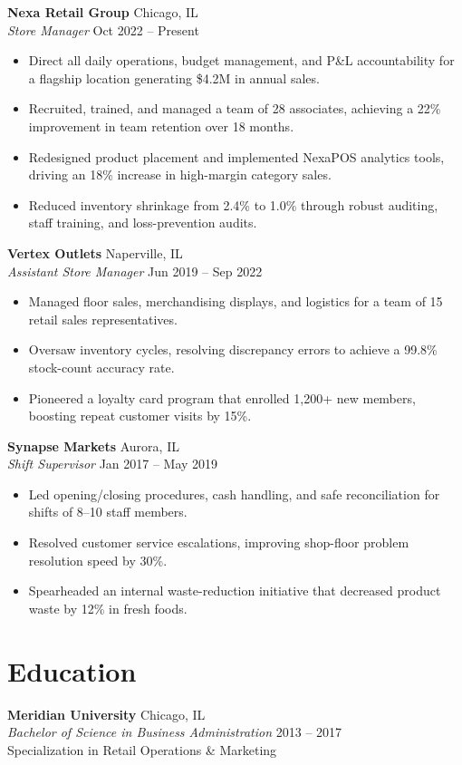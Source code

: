 \documentclass[10pt,letterpaper]{article}
\begin{document}
\noindent
\textbf{Nexa Retail Group} \hfill Chicago, IL \\
\textit{Store Manager} \hfill Oct 2022 -- Present
\begin{itemize}
    \item Direct all daily operations, budget management, and P\&L accountability for a flagship location generating \$4.2M in annual sales.
    \item Recruited, trained, and managed a team of 28 associates, achieving a 22\% improvement in team retention over 18 months.
    \item Redesigned product placement and implemented NexaPOS analytics tools, driving an 18\% increase in high-margin category sales.
    \item Reduced inventory shrinkage from 2.4\% to 1.0\% through robust auditing, staff training, and loss-prevention audits.
\end{itemize}

\vspace{6pt}

\noindent
\textbf{Vertex Outlets} \hfill Naperville, IL \\
\textit{Assistant Store Manager} \hfill Jun 2019 -- Sep 2022
\begin{itemize}
    \item Managed floor sales, merchandising displays, and logistics for a team of 15 retail sales representatives.
    \item Oversaw inventory cycles, resolving discrepancy errors to achieve a 99.8\% stock-count accuracy rate.
    \item Pioneered a loyalty card program that enrolled 1,200+ new members, boosting repeat customer visits by 15\%.
\end{itemize}

\vspace{6pt}

\noindent
\textbf{Synapse Markets} \hfill Aurora, IL \\
\textit{Shift Supervisor} \hfill Jan 2017 -- May 2019
\begin{itemize}
    \item Led opening/closing procedures, cash handling, and safe reconciliation for shifts of 8--10 staff members.
    \item Resolved customer service escalations, improving shop-floor problem resolution speed by 30\%.
    \item Spearheaded an internal waste-reduction initiative that decreased product waste by 12\% in fresh foods.
\end{itemize}

\vspace{4pt}

\section*{\faGraduationCap\enskip Education}
\noindent
\textbf{Meridian University} \hfill Chicago, IL \\
\textit{Bachelor of Science in Business Administration} \hfill 2013 -- 2017 \\
Specialization in Retail Operations \& Marketing
\end{document}
